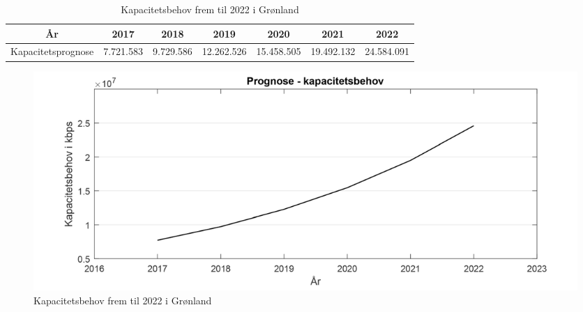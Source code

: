 \begin{table}
	\centering
    \begin{tabular}{|c|c|c|c|c|c|c|}
    \hline
    År                 & 2017      & 2018      & 2019       & 2020       & 2021       & 2022       \\ \hline
    Kapacitetsprognose & 7.721.583 & 9.729.586 & 12.262.526 & 15.458.505 & 19.492.132 & 24.584.091 \\ \hline
    \end{tabular}
    \caption{Kapacitetsbehov frem til 2022 i Grønland}
    \label{tab:kapacitetPrognose}
\end{table}
\begin{figure}
	\centering
	\includegraphics[width=1\textwidth]{figure/kapacitetsbehov.pdf}
	\caption{Kapacitetsbehov frem til 2022 i Grønland}
	\label{fig:kapacitetsbehov}
\end{figure}